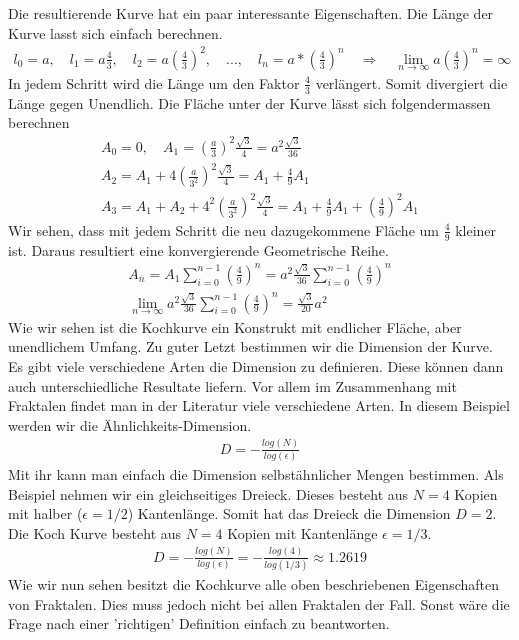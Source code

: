Die resultierende Kurve hat ein paar interessante Eigenschaften.
Die Länge der Kurve lasst sich einfach berechnen.
\begin{align*}
	l_0 = a ,\quad l_1 = a  \frac{4}{3} ,\quad l_2 = a  \left( \frac{4}{3}\right)^2 , \quad ... , \quad
	l_n = a * \left( \frac{4}{3}\right)^n \quad
	\Rightarrow \quad
	\lim_{n\to\infty} a  \left( \frac{4}{3}\right)^n = \infty
\end{align*}
In jedem Schritt wird die Länge um den Faktor $\frac{4}{3}$ verlängert. Somit divergiert die Länge gegen Unendlich. 
Die Fläche unter der Kurve lässt sich folgendermassen berechnen
\begin{align*}
	A_0 = 0 , \quad A_1 = \left( \frac{a}{3}\right)^2 \frac{\sqrt{3}}{4} = a^2 \frac{\sqrt{3}}{36}\\
	A_2 = A_1 + 4\left( \frac{a}{3^2}\right)^2 \frac{\sqrt{3}}{4} = A_1 + \frac{4}{9} A_1 \\ 
	A_3 = A_1 + A_2 + 4^2 \left( \frac{a}{3^2}\right)^2 \frac{\sqrt{3}}{4} = A_1 + \frac{4}{9} A_1 + \left( \frac{4}{9}\right)^2 A_1	 
\end{align*}
Wir sehen, dass mit jedem Schritt die neu dazugekommene Fläche um $\frac{4}{9}$ kleiner ist.
Daraus resultiert eine konvergierende Geometrische Reihe.
\begin{align*}
	A_n = A_1 \sum_{i = 0}^{n-1} \left( \frac{4}{9}\right)^n =  a^2 \frac{\sqrt{3}}{36} \sum_{i = 0}^{n-1} \left( \frac{4}{9}\right)^n \\
	\lim_{n\to\infty} a^2 \frac{\sqrt{3}}{36} \sum_{i = 0}^{n-1} \left( \frac{4}{9}\right)^n = \frac{\sqrt{3}}{20} a^2
\end{align*}
Wie wir sehen ist die Kochkurve ein Konstrukt mit endlicher Fläche, aber unendlichem Umfang.
Zu guter Letzt bestimmen wir die Dimension der Kurve. 
Es gibt viele verschiedene Arten die Dimension zu definieren. Diese können dann auch unterschiedliche Resultate liefern.
Vor allem im Zusammenhang mit Fraktalen findet man in der Literatur viele verschiedene Arten.
In diesem Beispiel werden wir die Ähnlichkeits-Dimension.
\begin{align*}
	D = - \frac{log(N)}{log(\epsilon)}
\end{align*}
Mit ihr kann man einfach die Dimension selbstähnlicher Mengen bestimmen.
Als Beispiel nehmen wir ein gleichseitiges Dreieck. Dieses besteht aus $N = 4$ Kopien mit halber ($\epsilon = 1/2$) Kantenlänge.
Somit hat das Dreieck die Dimension $D = 2$.
Die Koch Kurve besteht aus $N = 4$ Kopien mit Kantenlänge $\epsilon = 1/3$.
\begin{align*}
	D = - \frac{log(N)}{log(\epsilon)} = - \frac{log(4)}{log(1/3)} \approx 1.2619
\end{align*}
Wie wir nun sehen besitzt die Kochkurve alle oben beschriebenen Eigenschaften von Fraktalen. 
Dies muss jedoch nicht bei allen Fraktalen der Fall. Sonst wäre die Frage nach einer 'richtigen' Definition einfach zu beantworten.

